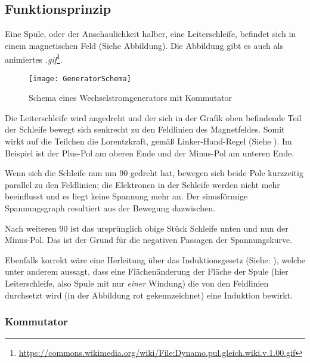 \subsection{Funktionsprinzip}

Eine Spule, oder der Anschaulichkeit halber, eine Leiterschleife, befindet sich in einem magnetischen Feld (Siehe Abbildung). Die Abbildung gibt es auch als animiertes \emph{.gif}\footnote{\url{https://commons.wikimedia.org/wiki/File:Dynamo.pul.gleich.wiki.v.1.00.gif}}.

\begin{figure}[h!]
	\centering
	\texttt{[image: GeneratorSchema]}
	\caption{Schema eines Wechselstromgenerators mit Kommutator} 
\end{figure}


Die Leiterschleife wird angedreht und der sich in der Grafik oben befindende Teil der Schleife bewegt sich senkrecht zu den Feldlinien des Magnetfeldes. Somit wirkt auf die Teilchen die Lorentzkraft, gemäß Linker-Hand-Regel (Siehe ). Im Beispiel ist der Plus-Pol am oberen Ende und der Minus-Pol am unteren Ende.

Wenn sich die Schleife nun um 90\degree{} gedreht hat, bewegen sich beide Pole kurzzeitig parallel zu den Feldlinien; die Elektronen in der Schleife werden nicht mehr beeinflusst und es liegt keine Spannung mehr an. Der sinusförmige Spannungsgraph resultiert aus der Bewegung dazwischen.

Nach weiteren 90\degree{} ist das ursprünglich obige Stück Schleife unten und nun der Minus-Pol. Das ist der Grund für die negativen Passagen der Spannungskurve.

Ebenfalls korrekt wäre eine Herleitung über das Induktionsgesetz (Siehe: ), welche unter anderem aussagt, dass eine Flächenänderung der Fläche der Spule (hier Leiterschleife, also Spule mit nur \emph{einer} Windung) die von den Feldlinien durchsetzt wird (in der Abbildung rot gekennzeichnet) eine Induktion bewirkt.


\subsubsection{Kommutator}

